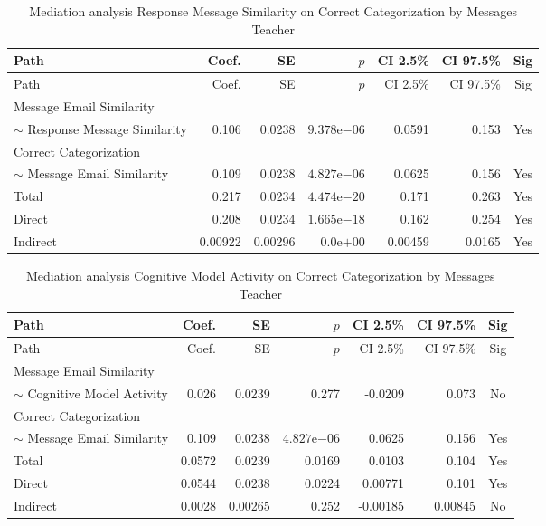 \begin{longtable}{lrrrrrc}
            \caption{Mediation analysis Response Message Similarity on Correct Categorization by  Messages Teacher}\label{tab:mediation Response Message Similarity on Correct Categorization by  Messages Teacher}\\
            \toprule
            Path & Coef. & SE & $p$ & CI 2.5\% & CI 97.5\% & Sig \\
            \midrule
            \endfirsthead
            \toprule
            Path & Coef. & SE & $p$ & CI 2.5\% & CI 97.5\% & Sig \\
            \midrule
            \endhead
            \bottomrule
            \endfoot
            Message Email Similarity\\ $\sim$ Response Message Similarity & 0.106 & 0.0238 & $9.378\mathrm{e}{-06}$ & 0.0591 & 0.153 & Yes \\
Correct Categorization\\ $\sim$ Message Email Similarity & 0.109 & 0.0238 & $4.827\mathrm{e}{-06}$ & 0.0625 & 0.156 & Yes \\
Total & 0.217 & 0.0234 & $4.474\mathrm{e}{-20}$ & 0.171 & 0.263 & Yes \\
Direct & 0.208 & 0.0234 & $1.665\mathrm{e}{-18}$ & 0.162 & 0.254 & Yes \\
Indirect & 0.00922 & 0.00296 & $0.0\mathrm{e}{+00}$ & 0.00459 & 0.0165 & Yes \\
\end{longtable}

\begin{longtable}{lrrrrrc}
            \caption{Mediation analysis Cognitive Model Activity on Correct Categorization by  Messages Teacher}\label{tab:mediation Cognitive Model Activity on Correct Categorization by  Messages Teacher}\\
            \toprule
            Path & Coef. & SE & $p$ & CI 2.5\% & CI 97.5\% & Sig \\
            \midrule
            \endfirsthead
            \toprule
            Path & Coef. & SE & $p$ & CI 2.5\% & CI 97.5\% & Sig \\
            \midrule
            \endhead
            \bottomrule
            \endfoot
            Message Email Similarity\\ $\sim$ Cognitive Model Activity & 0.026 & 0.0239 & 0.277 & -0.0209 & 0.073 & No \\
Correct Categorization\\ $\sim$ Message Email Similarity & 0.109 & 0.0238 & $4.827\mathrm{e}{-06}$ & 0.0625 & 0.156 & Yes \\
Total & 0.0572 & 0.0239 & 0.0169 & 0.0103 & 0.104 & Yes \\
Direct & 0.0544 & 0.0238 & 0.0224 & 0.00771 & 0.101 & Yes \\
Indirect & 0.0028 & 0.00265 & 0.252 & -0.00185 & 0.00845 & No \\
\end{longtable}

